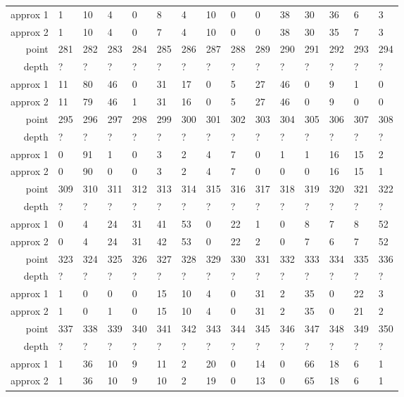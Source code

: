 \begin{center}
\begin{supertabular}{|r|l l l l l l l l l l l l l l|}
approx 1 & 1 & 10 & 4 & 0 & 8 & 4 & 10 & 0 & 0 & 38 & 30 & 36 & 6 & 3 \\
approx 2 & 1 & 10 & 4 & 0 & 7 & 4 & 10 & 0 & 0 & 38 & 30 & 35 & 7 & 3 \\
\hline
point & 281 & 282 & 283 & 284 & 285 & 286 & 287 & 288 & 289 & 290 & 291 & 292 & 293 & 294 \\
\hline
depth & ? & ? & ? & ? & ? & ? & ? & ? & ? & ? & ? & ? & ? & ? \\
approx 1 & 11 & 80 & 46 & 0 & 31 & 17 & 0 & 5 & 27 & 46 & 0 & 9 & 1 & 0 \\
approx 2 & 11 & 79 & 46 & 1 & 31 & 16 & 0 & 5 & 27 & 46 & 0 & 9 & 0 & 0 \\
\hline
point & 295 & 296 & 297 & 298 & 299 & 300 & 301 & 302 & 303 & 304 & 305 & 306 & 307 & 308 \\
\hline
depth & ? & ? & ? & ? & ? & ? & ? & ? & ? & ? & ? & ? & ? & ? \\
approx 1 & 0 & 91 & 1 & 0 & 3 & 2 & 4 & 7 & 0 & 1 & 1 & 16 & 15 & 2 \\
approx 2 & 0 & 90 & 0 & 0 & 3 & 2 & 4 & 7 & 0 & 0 & 0 & 16 & 15 & 1 \\
\hline
point & 309 & 310 & 311 & 312 & 313 & 314 & 315 & 316 & 317 & 318 & 319 & 320 & 321 & 322 \\
\hline
depth & ? & ? & ? & ? & ? & ? & ? & ? & ? & ? & ? & ? & ? & ? \\
approx 1 & 0 & 4 & 24 & 31 & 41 & 53 & 0 & 22 & 1 & 0 & 8 & 7 & 8 & 52 \\
approx 2 & 0 & 4 & 24 & 31 & 42 & 53 & 0 & 22 & 2 & 0 & 7 & 6 & 7 & 52 \\
\hline
point & 323 & 324 & 325 & 326 & 327 & 328 & 329 & 330 & 331 & 332 & 333 & 334 & 335 & 336 \\
\hline
depth & ? & ? & ? & ? & ? & ? & ? & ? & ? & ? & ? & ? & ? & ? \\
approx 1 & 1 & 0 & 0 & 0 & 15 & 10 & 4 & 0 & 31 & 2 & 35 & 0 & 22 & 3 \\
approx 2 & 1 & 0 & 1 & 0 & 15 & 10 & 4 & 0 & 31 & 2 & 35 & 0 & 21 & 2 \\
\hline
point & 337 & 338 & 339 & 340 & 341 & 342 & 343 & 344 & 345 & 346 & 347 & 348 & 349 & 350 \\
\hline
depth & ? & ? & ? & ? & ? & ? & ? & ? & ? & ? & ? & ? & ? & ? \\
approx 1 & 1 & 36 & 10 & 9 & 11 & 2 & 20 & 0 & 14 & 0 & 66 & 18 & 6 & 1 \\
approx 2 & 1 & 36 & 10 & 9 & 10 & 2 & 19 & 0 & 13 & 0 & 65 & 18 & 6 & 1 \\

\end{supertabular}
\end{center}
